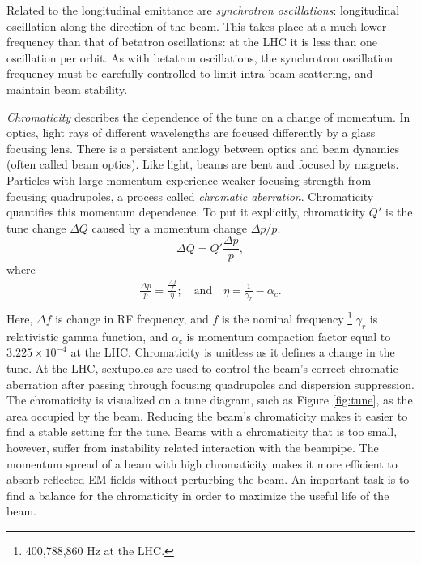 Related to the longitudinal emittance are \emph{synchrotron oscillations}: longitudinal oscillation along the direction of the beam.
This takes place at a much lower frequency than that of betatron oscillations: at the LHC it is less than one oscillation per orbit.
As with betatron oscillations, the synchrotron oscillation frequency must be carefully controlled to limit intra-beam scattering, and maintain beam stability.\cite{pdgAccelSection}

\emph{Chromaticity} describes the dependence of the tune on a change of momentum.
In optics, light rays of different wavelengths are focused differently by a glass focusing lens.
There is a persistent analogy between optics and beam dynamics (often called beam optics). Like light, beams are bent and focused by magnets. 
Particles with large momentum experience weaker focusing strength from focusing quadrupoles, a process called \emph{chromatic aberration}.
Chromaticity quantifies this momentum dependence.
To put it explicitly, chromaticity $Q'$ is the tune change $\Delta Q$ caused by a momentum change $\Delta p/p$. \cite{fuchsberger}
\begin{equation}
    \Delta Q = Q'\frac{\Delta p}{p},
\end{equation}
where
\begin{equation}
\begin{split}
    \frac{\Delta p}{p} = \frac{\frac{\Delta f}{f}}{\eta}; \quad\text{and}\quad \eta = \frac{1}{\gamma_r}-\alpha_c. \\
\end{split}
\end{equation}
Here, $\Delta f$ is change in RF frequency, and $f$ is the nominal frequency \footnote{400,788,860 Hz at the LHC.} 
$\gamma_r$ is relativistic gamma function, and $\alpha_c$ is momentum compaction factor equal to $3.225\times10^{-4}$ at the LHC.
Chromaticity is unitless as it defines a change in the tune.
At the LHC, sextupoles are used to control the beam's correct chromatic aberration after passing through focusing quadrupoles and dispersion suppression. \cite{frascati} \cite{bruno}
The chromaticity is visualized on a tune diagram, such as Figure \ref{fig:tune}, as the area occupied by the beam.
Reducing the beam's chromaticity makes it easier to find a stable setting for the tune.
Beams with a chromaticity that is too small, however, suffer from instability related interaction with the beampipe.
The momentum spread of a beam with high chromaticity makes it more efficient to absorb reflected EM fields without perturbing the beam.
An important task is to find a balance for the chromaticity in order to maximize the useful life of the beam.

